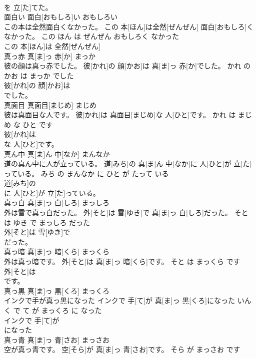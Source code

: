 \documentclass[8pt]{extreport}
\begin{document}
\begin{CJK}{UTF8}{min}
\\	を 立[た]てた。			
\\	面白い	面白[おもしろ]い	おもしろい	
\\	この本は全然面白くなかった。	この 本[ほん]は全然[ぜんぜん] 面白[おもしろ]くなかった。	この ほん は ぜんぜん おもしろく なかった	
\\	この 本[ほん]は 全然[ぜんぜん]
\\	真っ赤	真[ま]っ 赤[か]	まっか	
\\	彼の顔は真っ赤でした。	彼[かれ]の 顔[かお]は 真[ま]っ 赤[か]でした。	かれ の かお は まっか でした	
\\	彼[かれ]の 顔[かお]は
\\	でした。			
\\	真面目	真面目[まじめ]	まじめ	
\\	彼は真面目な人です。	彼[かれ]は 真面目[まじめ]な 人[ひと]です。	かれ は まじめ な ひと です	
\\	彼[かれ]は
\\	な 人[ひと]です。			
\\	真ん中	真[ま]ん 中[なか]	まんなか	
\\	道の真ん中に人が立っている。	道[みち]の 真[ま]ん 中[なか]に 人[ひと]が 立[た]っている。	みち の まんなか に ひと が たって いる	
\\	道[みち]の
\\	に 人[ひと]が 立[た]っている。			
\\	真っ白	真[ま]っ 白[しろ]	まっしろ	
\\	外は雪で真っ白だった。	外[そと]は 雪[ゆき]で 真[ま]っ 白[しろ]だった。	そと は ゆき で まっしろ だった	
\\	外[そと]は 雪[ゆき]で
\\	だった。			
\\	真っ暗	真[ま]っ 暗[くら]	まっくら	
\\	外は真っ暗です。	外[そと]は 真[ま]っ 暗[くら]です。	そと は まっくら です	
\\	外[そと]は
\\	です。			
\\	真っ黒	真[ま]っ 黒[くろ]	まっくろ	
\\	インクで手が真っ黒になった	インクで 手[て]が 真[ま]っ 黒[くろ]になった	いんく で て が まっくろ に なった	
\\	インクで 手[て]が
\\	になった			
\\	真っ青	真[ま]っ 青[さお]	まっさお	
\\	空が真っ青です。	空[そら]が 真[ま]っ 青[さお]です。	そら が まっさお です	

\end{CJK}
\end{document}

